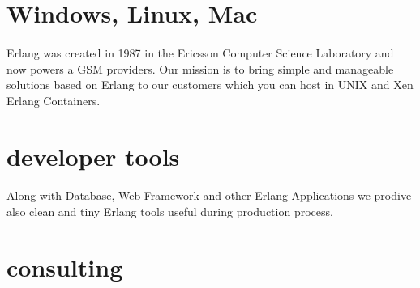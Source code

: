 \documentclass[11pt]{article}
\begin{document}
\paragraph{}
\paragraph{}

\section*{Windows, Linux, Mac}
\paragraph{}
Erlang was created in 1987 in the Ericsson Computer Science Laboratory
and now powers a GSM providers. Our mission is to bring simple and
manageable solutions based on Erlang to our customers which you can
host in UNIX and Xen Erlang Containers.

\section*{developer tools}
\paragraph{}
Along with Database, Web Framework and other Erlang Applications
we prodive also clean and tiny Erlang tools useful during
production process.

\section*{consulting}
\end{document}
